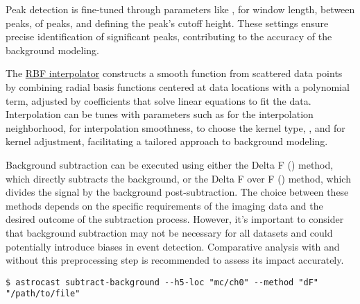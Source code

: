 Peak detection is fine-tuned through parameters like ,  for window length,  between peaks,  of peaks, and  defining the peak's cutoff height. These settings ensure precise identification of significant peaks, contributing to the accuracy of the background modeling.

The \href{https://docs.scipy.org/doc/scipy/reference/generated/scipy.interpolate.RBFInterpolator.html}{RBF interpolator} constructs a smooth function from scattered data points by combining radial basis functions centered at data locations with a polynomial term, adjusted by coefficients that solve linear equations to fit the data. Interpolation can be tunes with parameters such as  for the interpolation neighborhood,  for interpolation smoothness,  to choose the kernel type, , and  for kernel adjustment, facilitating a tailored approach to background modeling.

Background subtraction can be executed using either the Delta F () method, which directly subtracts the background, or the Delta F over F () method, which divides the signal by the background post-subtraction. The choice between these methods depends on the specific requirements of the imaging data and the desired outcome of the subtraction process. However, it's important to consider that background subtraction may not be necessary for all datasets and could potentially introduce biases in event detection. Comparative analysis with and without this preprocessing step is recommended to assess its impact accurately.

\begin{lstlisting}[style=bashStyle]
    $ astrocast subtract-background --h5-loc "mc/ch0" --method "dF" "/path/to/file"
\end{lstlisting}